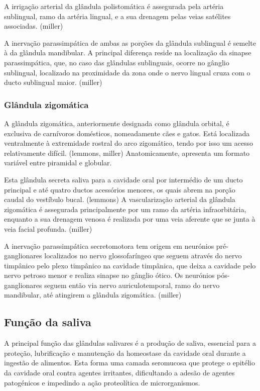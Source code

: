 A irrigação arterial da glândula polistomática é assegurada pela artéria sublingual, ramo da artéria lingual, e a sua drenagem pelas veias satélites associadas. (miller)


A inervação parassimpática de ambas as porções da glândula sublingual é semel\cite{Han2016}te à da glândula mandibular. A principal diferença reside na localização da sinapse parassimpática, que, no caso das glândulas sublinguais, ocorre no gânglio sublingual, localizado na proximidade da zona onde o nervo lingual cruza com o ducto sublingual maior. (miller)

\subsubsection{Glândula zigomática}

A glândula zigomática, anteriormente designada como glândula orbital, é exclusiva de carnívoros domésticos, nomeadamente cães e gatos. Está localizada ventralmente à extremidade rostral do arco zigomático, tendo por isso um acesso relativamente difícil. (lemmons, miller) 
Anatomicamente, apresenta um formato variável entre piramidal e globular. 

Esta glândula secreta saliva para a cavidade oral por intermédio de um ducto principal e até quatro ductos acessórios menores, os quais abrem na porção caudal do vestíbulo bucal. (lemmons)
A vascularização arterial da glândula zigomática é assegurada principalmente por um ramo da artéria infraorbitária, enquanto a sua drenagem venosa é realizada por uma veia aferente que se junta à veia facial profunda. (miller)

A inervação parassimpática secretomotora tem origem em neurónios pré- ganglionares localizados no nervo glossofaríngeo que seguem através do nervo timpânico pelo plexo timpânico na cavidade timpânica, que deixa a cavidade pelo nervo petroso menor e realiza sinapse no gânglio ótico. Os neurónios pós-ganglionares seguem então via nervo auriculotemporal, ramo do nervo mandibular, até atingirem a glândula zigomática. (miller)

\subsection{Função da saliva}

A principal função das glândulas salivares é a produção de saliva, essencial para a proteção, lubrificação e manutenção da homeostase da cavidade oral durante a ingestão de alimentos. Esta forma uma camada seromucosa que protege o epitélio da cavidade oral contra agentes irritantes, dificultando a adesão de agentes patogénicos e impedindo a ação proteolítica de microrganismos.  


